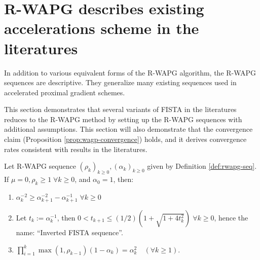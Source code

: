 \documentclass[12pt]{article}
\begin{document}
\section{R-WAPG describes existing accelerations scheme in the literatures}
    In addition to various equivalent forms of the R-WAPG algorithm, the R-WAPG sequences are descriptive. 
    They generalize many existing sequences used in accelerated proximal gradient schemes. 
    \par
    This section demonstrates that several variants of FISTA in the literatures reduces to the R-WAPG method by setting up the R-WAPG sequences with additional assumptions. 
    This section will also demonstrate that the convergence claim (Proposition \ref{prop:wagp-convergence}) holds, and it derives convergence rates consistent with results in the literatures.  
    \begin{lemma}\label{lemma:inverted-fista-seq}
        Let R-WAPG sequence $(\rho_k)_{k \ge 0}, (\alpha_k)_{k \ge 0}$ given by Definition \ref{def:rwapg-seq}. 
        If $\mu = 0, \rho_k \ge 1\; \forall k \ge 0$, and $\alpha_0 = 1$, then: 
        \begin{enumerate}
            \item $\alpha_k^{-2} \ge \alpha_{k + 1}^{-2} - \alpha_{k + 1}^{-1}\; \forall k \ge 0$
            \item Let $t_k := \alpha_k^{-1}$, then $0 < t_{k + 1} \le (1/2)\left(1 + \sqrt{1 + 4t_k^2}\right)\;\forall k\ge 0$, hence the name: ``Inverted FISTA sequence''. 
            \item $\prod_{i = 1}^k\max(1, \rho_{k - 1})(1 - \alpha_k) = \alpha_k^2 \quad (\forall k \ge 1)$. 
        \end{enumerate}
    \end{lemma}
\end{document}

